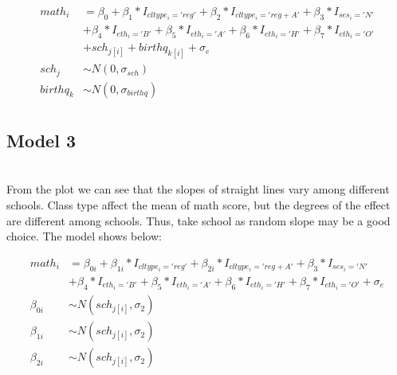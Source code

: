 \documentclass{article}
\begin{document}
\begin{align*}
    math_i &= \beta_0 + \beta_1*I_{cltype_i='reg'} + \beta_2*I_{cltype_i='reg+A'} + \beta_3*I_{ses_i='N'} \\
    &+ \beta_4*I_{eth_i='B'} + \beta_5*I_{eth_i='A'} + \beta_6*I_{eth_i='H'} + \beta_7*I_{eth_i='O'} \\ 
    &+ sch_{j[i]} + birthq_{k[i]} + \sigma_e\\
    sch_j &\sim N(0, \sigma_{sch})\\
    birthq_k &\sim N(0, \sigma_{birthq})\\
\end{align*}

\subsection{Model 3}

\begin{minipage}{\linewidth}
    \label{fig:random slope}
\end{minipage}\\

From the plot we can see that the slopes of straight lines vary among different schools. Class type affect the mean of math score, 
but the degrees of the effect are different among schools. Thus, take school as random slope may be a good choice. The model shows below:

\begin{align*}
    math_i &= \beta_{0i} + \beta_{1i}*I_{cltype_i='reg'} + \beta_{2i}*I_{cltype_i='reg+A'} + \beta_3*I_{ses_i='N'} \\
    &+ \beta_4*I_{eth_i='B'} + \beta_5*I_{eth_i='A'} + \beta_6*I_{eth_i='H'} + \beta_7*I_{eth_i='O'} + \sigma_e\\
    \beta_{0i} &\sim N(sch_{j[i]}, \sigma_2)\\
    \beta_{1i} &\sim N(sch_{j[i]}, \sigma_2)\\
    \beta_{2i} &\sim N(sch_{j[i]}, \sigma_2)\\
\end{align*}
\end{document}
